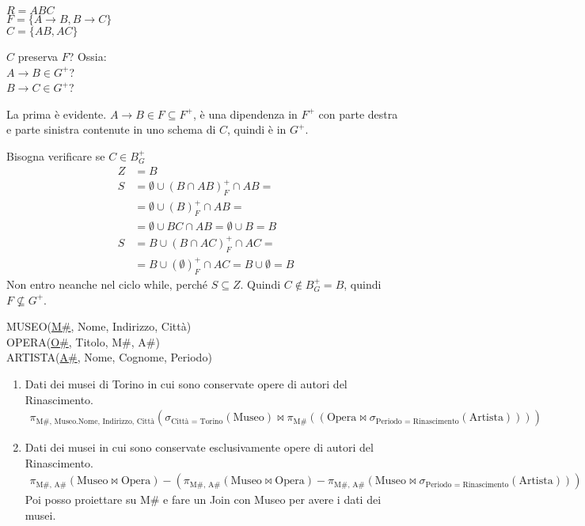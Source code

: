 \begin{exmp}
$R = ABC$ \\
$F = \{ A \to B, B \to C \}$ \\
$C = \{AB, AC\}$

$C$ preserva $F$? Ossia: \\
$A \to B \in G^{+}$? \\
$B \to C \in G^{+}$?

La prima \`e evidente. $A \to B \in F \subseteq F^{+}$, \`e una dipendenza in $F^{+}$ con parte destra e parte sinistra contenute in uno schema di $C$, quindi \`e in $G^{+}$.

Bisogna verificare se $C \in B^{+}_{G}$
\begin{align*}
Z &= B \\
S &= \emptyset \cup (B \cap AB)^{+}_{F} \cap AB = \\
&= \emptyset \cup (B)^{+}_{F} \cap AB = \\
&= \emptyset \cup BC \cap AB = \emptyset \cup B = B \\
S &= B \cup (B \cap AC)^{+}_{F} \cap AC = \\
&= B \cup (\emptyset)^{+}_{F} \cap AC = B \cup \emptyset = B
\end{align*}
Non entro neanche nel ciclo while, perch\'e $S \subseteq Z$. Quindi $C \notin B^{+}_{G} = B$, quindi $F \not\subseteq G^{+}$.
\end{exmp}

\begin{esercizio}
MUSEO(\underline{M\#}, Nome, Indirizzo, Citt\`a) \\
OPERA(\underline{O\#}, Titolo, M\#, A\#) \\
ARTISTA(\underline{A\#}, Nome, Cognome, Periodo)
\begin{enumerate}
    \item Dati dei musei di Torino in cui sono conservate opere di autori del Rinascimento.
    \begin{align*}
    \pi_{\text{M\#, Museo.Nome, Indirizzo, Citt\`a}} \left(
    \sigma_{\text{Citt\`a = Torino}} (\text{Museo}) \Join
    \pi_{\text{M\#}} \left( \left( \text{Opera}
    \Join 
    \sigma_{\text{Periodo = Rinascimento}} (\text{Artista}) \right) \right) \right)
    \end{align*}
    \item Dati dei musei in cui sono conservate esclusivamente opere di autori del Rinascimento.
    \begin{align*}
    \pi_{\text{M\#, A\#}} ( \text{Museo} \Join \text{Opera} ) -
    \left( \pi_{\text{M\#, A\#}} ( \text{Museo} \Join \text{Opera} ) - 
    \pi_{\text{M\#, A\#}} ( \text{Museo} \Join \sigma_{\text{Periodo = Rinascimento}} (\text{Artista}) ) \right)
    \end{align*}
    Poi posso proiettare su M\# e fare un Join con Museo per avere i dati dei musei.
\end{enumerate}
\end{esercizio}

